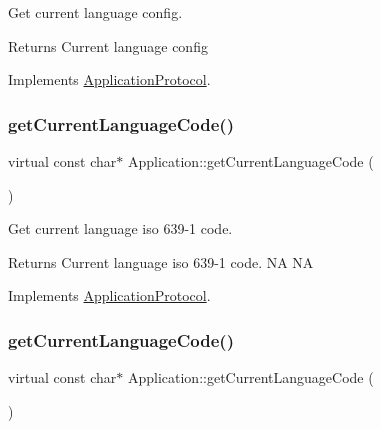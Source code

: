 Get current language config. 

\begin{DoxyReturn}{Returns}
Current language config 
\end{DoxyReturn}


Implements \hyperlink{classApplicationProtocol_a44034ed02f9dd0fc59264f74f9ef9b17}{Application\+Protocol}.

\mbox{\label{classApplication_aed89715279c32959c41ec88fa65018a7}} 
\subsubsection{\texorpdfstring{get\+Current\+Language\+Code()}{getCurrentLanguageCode()}\hspace{0.1cm}{\footnotesize\ttfamily [1/12]}}
{\footnotesize\ttfamily virtual const char$\ast$ Application\+::get\+Current\+Language\+Code (\begin{DoxyParamCaption}{ }\end{DoxyParamCaption})\hspace{0.3cm}{\ttfamily [virtual]}}



Get current language iso 639-\/1 code. 

\begin{DoxyReturn}{Returns}
Current language iso 639-\/1 code.  NA  NA 
\end{DoxyReturn}


Implements \hyperlink{classApplicationProtocol_a4cb7a696dd51fee3ebb3075f0cca1455}{Application\+Protocol}.

\mbox{\label{classApplication_aed89715279c32959c41ec88fa65018a7}} 
\subsubsection{\texorpdfstring{get\+Current\+Language\+Code()}{getCurrentLanguageCode()}\hspace{0.1cm}{\footnotesize\ttfamily [2/12]}}
{\footnotesize\ttfamily virtual const char$\ast$ Application\+::get\+Current\+Language\+Code (\begin{DoxyParamCaption}{ }\end{DoxyParamCaption})\hspace{0.3cm}{\ttfamily [virtual]}}



